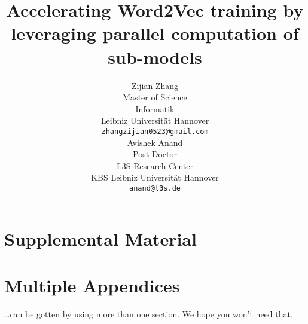 \documentclass[11pt,a4paper]{article}
\title{Accelerating Word2Vec training by leveraging parallel computation of sub-models}
\author{
  Zijian Zhang \\
  Master of Science\\
  Informatik\\
  Leibniz Universit{\"a}t Hannover\\
  {\tt zhangzijian0523@gmail.com}\\ \And
  Avishek Anand\\
  Post Doctor\\
  L3S Research Center\\
  KBS Leibniz Universit{\"a}t Hannover\\
  {\tt anand@l3s.de}\\
  }
\date{}
\begin{document}
\maketitle







\appendix

\section{Supplemental Material}
\label{sec:supplemental}

\section{Multiple Appendices}
\dots can be gotten by using more than one section. We hope you won't
need that.
\end{document}

